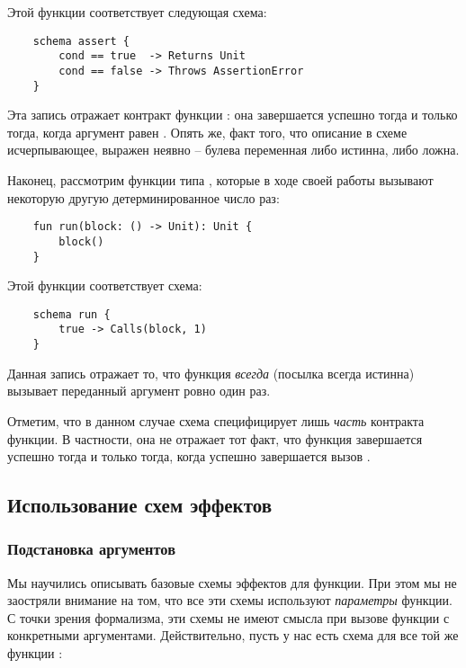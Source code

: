 Этой функции соответствует следующая схема:

\begin{verbatim}
    schema assert {
        cond == true  -> Returns Unit
        cond == false -> Throws AssertionError
    }
\end{verbatim}

Эта запись отражает контракт функции : она завершается успешно тогда и только тогда, когда аргумент равен . Опять же, факт того, что описание в схеме исчерпывающее, выражен неявно -- булева переменная либо истинна, либо ложна.


\bigskip


Наконец, рассмотрим функции типа , которые в ходе своей работы вызывают некоторую другую детерминированное число раз:

\begin{verbatim}
    fun run(block: () -> Unit): Unit {
        block()
    }
\end{verbatim}

Этой функции соответствует схема:

\begin{verbatim}
    schema run {
        true -> Calls(block, 1)
    }
\end{verbatim}

Данная запись отражает то, что функция  \emph{всегда} (посылка  всегда истинна) вызывает переданный аргумент  ровно один раз.

Отметим, что в данном случае схема специфицирует лишь \emph{часть} контракта функции. В частности, она не отражает тот факт, что функция завершается успешно тогда и только тогда, когда успешно завершается вызов .








\subsection{Использование схем эффектов}

\subsubsection{Подстановка аргументов}

Мы научились описывать базовые схемы эффектов для функции. При этом мы не заостряли внимание на том, что все эти схемы используют \emph{параметры} функции. С точки зрения формализма, эти схемы не имеют смысла при вызове функции с конкретными аргументами. Действительно, пусть у нас есть схема для все той же функции :

